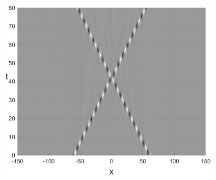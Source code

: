 \documentclass[preprint,12pt]{elsarticle}
\begin{document}
\begin{figure}[H]
\begin{minipage}[h]{0.32\linewidth}
\includegraphics[width=1\linewidth]{fig59g.eps}
\end{minipage}


\end{figure}
\end{document}
